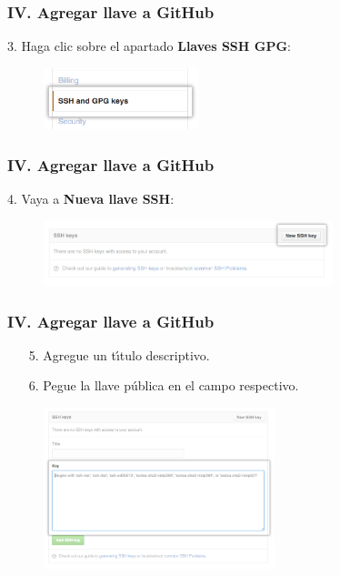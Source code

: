 \documentclass{beamer}
\begin{document}
\begin{frame}[fragile]
  \frametitle{IV. Agregar llave a GitHub}
  3. Haga clic sobre el apartado \textbf{Llaves SSH GPG}:
  \begin{figure}[hp]
    \centering \includegraphics[width=0.4\textwidth]{fig/settings-sidebar-ssh-keys}
    \label{fig:gssh02}
  \end{figure}
\end{frame}

\begin{frame}[fragile]
  \frametitle{IV. Agregar llave a GitHub}
  4. Vaya a \textbf{Nueva llave SSH}:
  \begin{figure}[hp]
    \centering \includegraphics[width=0.75\textwidth]{fig/ssh-add-ssh-key}
    \label{fig:gssh03}
  \end{figure}
\end{frame}

\begin{frame}[fragile]
  \frametitle{IV. Agregar llave a GitHub}
  \begin{itemize}
  \item[5.] Agregue un t\'\i{}tulo descriptivo.
  \item[6.] Pegue la llave p\'ublica en el campo respectivo.
  \end{itemize}
  \begin{figure}[hp]
    \centering \includegraphics[width=0.6\textwidth]{fig/ssh-key-paste}
    \label{fig:gssh04}
  \end{figure}
\end{frame}
\end{document}
